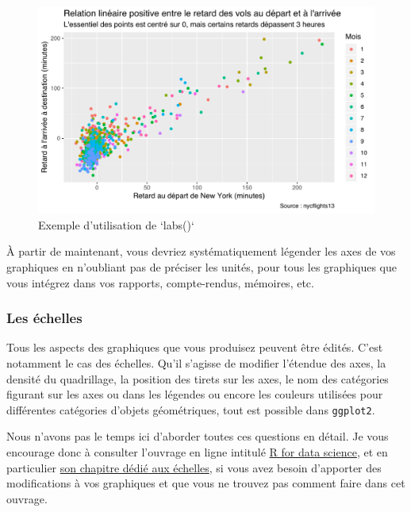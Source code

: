 \documentclass[a4paperpaper,]{article}
\theoremstyle{definition}
\theoremstyle{definition}
\theoremstyle{definition}
\theoremstyle{remark}
\begin{document}
\begin{figure}[htpb]

{\centering \includegraphics[width=0.9\linewidth]{figure/varcolorlabel2-1} 

}

\caption{Exemple d'utilisation de `labs()`}\label{fig:varcolorlabel2}
\end{figure}

À partir de maintenant, vous devriez systématiquement légender les axes
de vos graphiques en n'oubliant pas de préciser les unités, pour tous
les graphiques que vous intégrez dans vos rapports, compte-rendus,
mémoires, etc.

\hypertarget{les-echelles}{%
\subsubsection{Les échelles}\label{les-echelles}}

Tous les aspects des graphiques que vous produisez peuvent être édités.
C'est notamment le cas des échelles. Qu'il s'agisse de modifier
l'étendue des axes, la densité du quadrillage, la position des tirets
sur les axes, le nom des catégories figurant sur les axes ou dans les
légendes ou encore les couleurs utilisées pour différentes catégories
d'objets géométriques, tout est possible dans \texttt{ggplot2}.

Nous n'avons pas le temps ici d'aborder toutes ces questions en détail.
Je vous encourage donc à consulter l'ouvrage en ligne intitulé
\href{http://r4ds.had.co.nz/}{R for data science}, et en particulier
\href{http://r4ds.had.co.nz/graphics-for-communication.html\#scales}{son
chapitre dédié aux échelles}, si vous avez besoin d'apporter des
modifications à vos graphiques et que vous ne trouvez pas comment faire
dans cet ouvrage.
\end{document}
